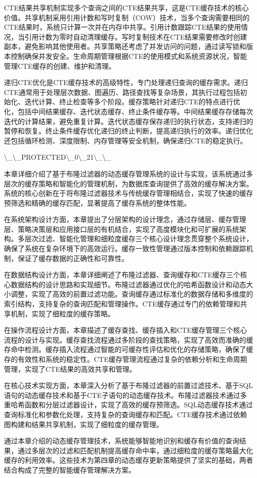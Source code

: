 CTE结果共享机制实现多个查询之间的CTE结果共享，这是CTE缓存技术的核心价值。共享机制采用引用计数和写时复制（COW）技术，当多个查询需要相同的CTE结果时，系统只计算一次并在内存中共享。引用计数跟踪CTE结果的使用情况，当引用计数为零时自动清理缓存。写时复制技术在CTE结果需要修改时创建副本，避免影响其他使用者。共享策略还考虑了并发访问的问题，通过读写锁和版本控制确保并发安全。生命周期管理根据CTE的使用模式和系统资源状况，智能管理CTE缓存的创建、维护和清理。

递归CTE优化是CTE缓存技术的高级特性，专门处理递归查询的缓存需求。递归CTE通常用于处理层次数据、图遍历、路径查找等复杂场景，其执行过程包括初始化、迭代计算、终止检查等多个阶段。缓存策略针对递归CTE的特点进行优化，包括中间结果缓存、迭代状态缓存、终止条件缓存等。中间结果缓存存储每次迭代的计算结果，避免重复计算。迭代状态缓存保存递归的执行状态，支持递归的暂停和恢复。终止条件缓存优化递归的终止判断，提高递归执行的效率。递归优化还包括循环检测、深度限制、内存管理等安全机制，确保递归CTE的稳定执行。

\textbackslash{}_\textbackslash{}_PROTECTED\textbackslash{}_0\textbackslash{}_21\textbackslash{}_\textbackslash{}_

本章详细介绍了基于布隆过滤器的动态缓存管理系统的设计与实现，该系统通过多层次的缓存策略和智能化的管理机制，为数据库查询提供了高效的缓存解决方案。系统的核心创新在于将布隆过滤器技术与传统缓存管理相结合，实现了快速的缓存预筛选和精确的缓存匹配，显著提高了缓存系统的整体性能。

在系统架构设计方面，本章提出了分层架构的设计理念，通过存储层、缓存管理层、策略决策层和应用接口层的有机结合，实现了高度模块化和可扩展的系统架构。多层次过滤、智能化管理和细粒度缓存三个核心设计理念贯穿整个系统设计，确保了系统在复杂环境下的高效运行。缓存一致性管理通过版本控制和依赖跟踪机制，保证了缓存数据的正确性和可靠性。

在数据结构设计方面，本章详细阐述了布隆过滤器、查询缓存和CTE缓存三个核心数据结构的设计思路和实现细节。布隆过滤器通过优化的哈希函数设计和动态大小调整，实现了高效的前置过滤功能。查询缓存通过标准化的数据存储和多维度的索引结构，支持复杂的查询匹配和管理操作。CTE缓存通过专门的依赖管理和共享机制，实现了细粒度的缓存策略。

在操作流程设计方面，本章描述了缓存查找、缓存插入和CTE缓存管理三个核心流程的设计与实现。缓存查找流程通过多阶段的查找策略，实现了高效而准确的缓存命中检测。缓存插入流程通过智能的可缓存性评估和优化的存储策略，确保了缓存的有效性和系统的稳定性。CTE缓存管理流程通过复杂的依赖分析和生命周期管理，实现了CTE结果的高效共享和管理。

在核心技术实现方面，本章深入分析了基于布隆过滤器的前置过滤技术、基于SQL语句的动态缓存技术和基于CTE子语句的动态缓存技术。布隆过滤器技术通过多重哈希函数和分层过滤器设计，实现了高效的缓存预筛选。SQL动态缓存技术通过查询标准化和参数化处理，支持复杂的查询缓存和匹配。CTE缓存技术通过依赖图构建和结果共享机制，实现了细粒度的缓存管理。

通过本章介绍的动态缓存管理技术，系统能够智能地识别和缓存有价值的查询结果，通过多层次的过滤和匹配机制提高缓存命中率，通过细粒度的缓存策略最大化缓存的利用效率。这些技术为第四章的动态缓存更新策略提供了坚实的基础，两者结合构成了完整的智能缓存管理解决方案。